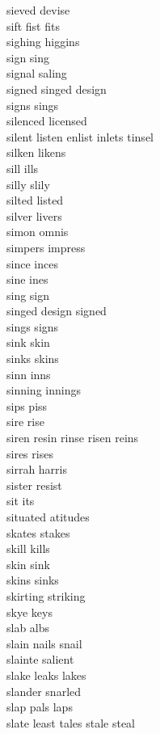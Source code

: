 sieved devise\\
sift fist fits\\
sighing higgins\\
sign sing\\
signal saling\\
signed singed design\\
signs sings\\
silenced licensed\\
silent listen enlist inlets tinsel\\
silken likens\\
sill ills\\
silly slily\\
silted listed\\
silver livers\\
simon omnis\\
simpers impress\\
since inces\\
sine ines\\
sing sign\\
singed design signed\\
sings signs\\
sink skin\\
sinks skins\\
sinn inns\\
sinning innings\\
sips piss\\
sire rise\\
siren resin rinse risen reins\\
sires rises\\
sirrah harris\\
sister resist\\
sit its\\
situated atitudes\\
skates stakes\\
skill kills\\
skin sink\\
skins sinks\\
skirting striking\\
skye keys\\
slab albs\\
slain nails snail\\
slainte salient\\
slake leaks lakes\\
slander snarled\\
slap pals laps\\
slate least tales stale steal\\
